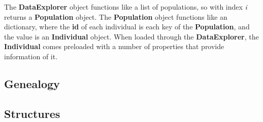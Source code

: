 \documentclass[11pt]{article}
\begin{document}
The \textbf{DataExplorer} object functions like a list of populations, so with index \emph{i} returns a \textbf{Population} object. The \textbf{Population} object functions like an dictionary, where the \textbf{id} of each individual is each key of the \textbf{Population}, and the value is an \textbf{Individual} object. When loaded through the \textbf{DataExplorer}, the \textbf{Individual} comes preloaded with a number of properties that provide information of it.

\subsection{Genealogy}
\label{sec:orgheadline5}
\subsection{Structures}
\label{sec:orgheadline6}
\end{document}
